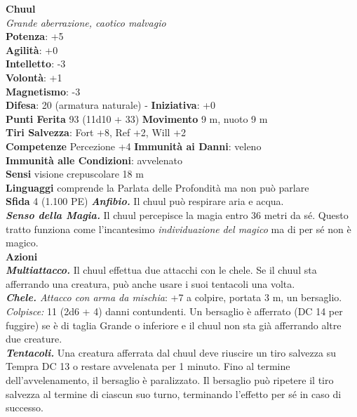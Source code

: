 \begin{multicols}{2}
\medskip\textbf{Chuul}\\
\emph{Grande aberrazione, caotico malvagio}\\
\textbf{Potenza}: +5\\
\textbf{Agilità}: +0\\
\textbf{Intelletto}: -3\\
\textbf{Volontà}: +1\\
\textbf{Magnetismo}: -3\\
\textbf{Difesa}: 20 (armatura naturale) - \textbf{Iniziativa}: +0\\
\textbf{Punti Ferita} 93 (11d10 + 33)
\textbf{Movimento} 9 m, nuoto 9 m\\
\textbf{Tiri Salvezza}: Fort +8, Ref +2, Will +2\\
\textbf{Competenze} Percezione +4 \textbf{Immunità ai Danni}: veleno\\
\textbf{Immunità alle Condizioni}: avvelenato\\
\textbf{Sensi} visione crepuscolare 18 m\\
\textbf{Linguaggi} comprende la Parlata delle Profondità ma non può parlare\\
\textbf{Sfida} 4 (1.100 PE)\smallskip
\emph{\textbf{Anfibio.}} Il chuul può respirare aria e acqua.\\
\emph{\textbf{Senso della Magia.}} Il chuul percepisce la magia entro 36 metri da sé. Questo tratto funziona come l'incantesimo \emph{individuazione} \emph{del magico} ma di per sé non è magico.\\
\smallskip\textbf{Azioni}\\
\emph{\textbf{Multiattacco.}} Il chuul effettua due attacchi con le chele. Se il chuul sta afferrando una creatura, può anche usare i suoi tentacoli una volta.\\
\emph{\textbf{Chele.} Attacco con arma da mischia}: +7 a colpire, portata 3 m, un bersaglio.\\
\emph{Colpisce:} 11 (2d6 + 4) danni contundenti. Un bersaglio è afferrato (DC 14 per fuggire) se è di taglia Grande o inferiore e il chuul non sta già afferrando altre due creature.\\
\emph{\textbf{Tentacoli.}} Una creatura afferrata dal chuul deve riuscire un tiro salvezza su Tempra DC 13 o restare avvelenata per 1 minuto. Fino al termine dell'avvelenamento, il bersaglio è paralizzato. Il bersaglio può ripetere il tiro salvezza al termine di ciascun suo turno, terminando l'effetto per sé in caso di successo.


\end{multicols}
